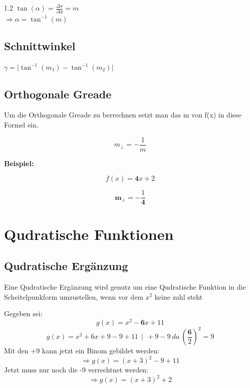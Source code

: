 \documentclass{article}
\newcommand{\Zeilenabstand}{1.2}
\newcommand{\absatz}{5mm}
\begin{document}
\begin{spacing}{\Zeilenabstand}
    $ \tan(\alpha) = \frac{\Delta x}{\Delta y } = m $\\
    $\Rightarrow \alpha = \tan^{-1}(m)$

    \subsection{Schnittwinkel}

    $ \gamma = \vert \tan^{-1}(m_1) - \tan^{-1}(m_2)\vert $
    
    \subsection{Orthogonale Greade }

    Um die Orthogonale Greade zu berrechnen setzt man das m von f(x) in diese Formel ein.

    \begin{equation}
        m_{\bot} = -\frac{1}{m}
    \end{equation}

    \vspace{\absatz}

    \textbf{Beispiel:}

    \begin{equation}
        f(x) = \mathbf{4}x + 2
    \end{equation}

    \begin{equation}
        \mathbf{m}_{\bot} = -\frac{1}{\mathbf{4}}
    \end{equation}

    \newpage


    \section{Qudratische Funktionen}

    \subsection{Qudratische Ergänzung}

    Eine Qudratische Ergänzung wird genutz um eine Qudratische Funktion 
    in die Scheitelpunkform umzustellen, wenn vor dem $x^{2}$ keine zahl steht

    Gegeben sei: 
    \begin{equation}
         g(x) = x^2 - \textbf{6}x + 11 
    \end{equation}
    \begin{equation}
        g(x) =  x^2 + 6x + 9 - 9 + 11  \ \   \vert \ \ +9 -9\ da \  (\frac{\textbf{6}}{2})^2 = 9
    \end{equation}
    Mit den +9 kann jetzt ein Binom gebildet werden:
    \begin{equation}
        \Rightarrow g(x) = (x+3)^2 -9 +11 
    \end{equation}
    Jetzt muss nur noch die -9 verrechtnet werden:
    \begin{equation}
        \Rightarrow g(x) = (x+3)^{2} + 2 
    \end{equation}


\end{spacing}
\end{document}
